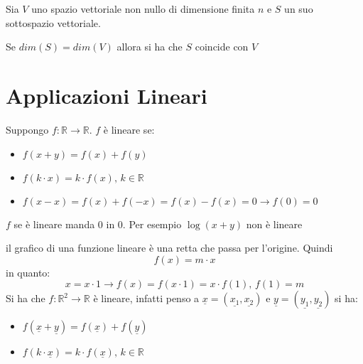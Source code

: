 \documentclass[a4paper,12pt, oneside]{book}
\begin{document}
\begin{teorema}
Sia $V$ uno spazio vettoriale non nullo di dimensione finita $n$ e $S$ un suo sottospazio vettoriale.\begin{center} Se $dim(S)=dim(V)$ allora si ha che $S$ coincide con $V$\end{center}
\end{teorema}

\chapter{Applicazioni Lineari}
\begin{definizione}
Suppongo $f:\mathbb{R}\rightarrow \mathbb{R}$. $f$ è lineare se:
\begin{itemize}
\item $f(x+y)=f(x)+f(y)$
\item $f(k\cdot x)=k\cdot f(x), \,k\in \mathbb{R}$
\item $f(x-x)=f(x)+f(-x)= f(x)-f(x)=0\longrightarrow f(0)=0$
\end{itemize}
$f$ se è lineare manda 0 in 0.
Per esempio $\log(x+y)$ non è lineare
\end{definizione}
il grafico di una funzione lineare è una retta che passa per l'origine.
Quindi $$f(x)=m\cdot x$$ in quanto: $$x=x\cdot 1\rightarrow f(x)=f(x\cdot 1)=x\cdot f(1),\, f(1)=m$$
Si ha che $f:\mathbb{R}^2\rightarrow \mathbb{R}$ è lineare, infatti penso a $\underline{x}=(\underline{x_1},\underline{x_2})$  e $\underline{y}=(\underline{y_1},\underline{y_2})$ si ha:
\begin{itemize}
\item  $f(\underline{x}+\underline{y})=f(\underline{x})+f(\underline{y})$
\item $f(k\cdot \underline{x})=k\cdot f(\underline{x}), \,k\in \mathbb{R}$
\end{itemize}
\end{document}
